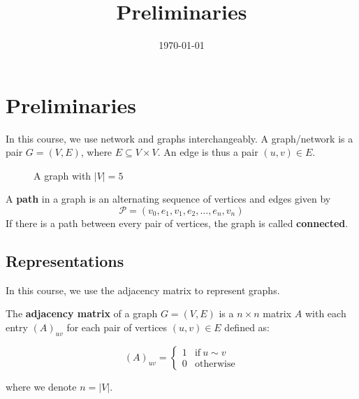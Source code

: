 \documentclass{article}
\title{Preliminaries}
\date{\today}
\begin{document}
\maketitle

\section{Preliminaries}
In this course, we use network and graphs interchangeably. A graph/network is a pair $G=(V, E)$, where $E \subseteq V \times V$. An edge is thus a pair $(u,v) \in E$. 

\begin{figure}[H]
    \centering
    \caption{A graph with $|V|=5$}
    \label{fig: example graph}
\end{figure}

\begin{definition}
    A \textbf{path} in a graph is an alternating sequence of vertices and edges given by 
    $$
    \mathcal{P} = (v_0, e_1, v_1, e_2, \ldots, e_n,v_n)
    $$
    If there is a path between every pair of vertices, the graph is called \textbf{connected}. 
\end{definition}

\subsection{Representations} 

In this course, we use the adjacency matrix to represent graphs.  

\begin{definition}
    The \textbf{adjacency matrix} of a graph $G=(V,E)$ is a $n\times n$ matrix $A$ with each entry $(A)_{uv}$ for each pair of vertices $(u,v)\in E$ defined as:
    \begin{singlespace}
        \begin{equation*}
         (A)_{uv} = \begin{cases}
            1 & \mathrm{if} \ u\sim v \\
            0 & \mathrm{otherwise}
        \end{cases}
    \end{equation*}
    \end{singlespace}
    where we denote $n=|V|$.
\end{definition}  
\end{document}
